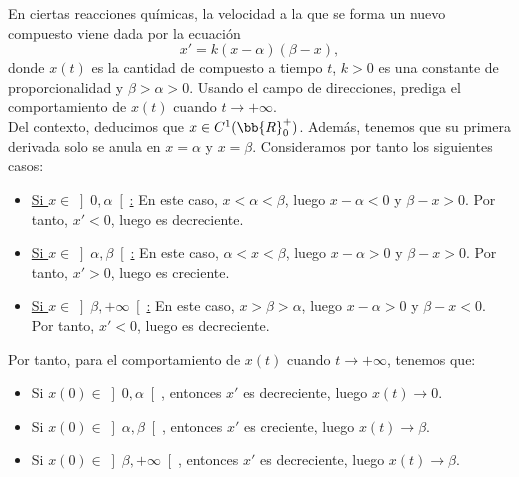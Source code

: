 \begin{ejercicio}
    En ciertas reacciones químicas, la velocidad a la que se forma un nuevo compuesto viene dada por la ecuación
    \begin{equation*}
        x' = k(x - \alpha)(\beta - x),
    \end{equation*}
    donde \(x(t)\) es la cantidad de compuesto a tiempo \(t\), \(k > 0\) es una constante de proporcionalidad y \(\beta > \alpha > 0\). Usando el campo de direcciones, prediga el comportamiento de \(x(t)\) cuando \(t \to +\infty\).\\

    Del contexto, deducimos que $x\in C^1(\bb{R}^+_0)$. Además, tenemos que su primera derivada solo se anula en $x=\alpha$ y $x=\beta$.
    Consideramos por tanto los siguientes casos:
    \begin{itemize}
        \item \ul{Si $x\in \left]0, \alpha\right[$:} En este caso, $x<\alpha<\beta$, luego $x-\alpha<0$ y $\beta-x>0$. Por tanto, $x'<0$,
        luego es decreciente.
        \item \ul{Si $x\in \left]\alpha, \beta\right[$:} En este caso, $\alpha<x<\beta$, luego $x-\alpha>0$ y $\beta-x>0$. Por tanto, $x'>0$,
        luego es creciente.
        \item \ul{Si $x\in \left]\beta, +\infty\right[$:} En este caso, $x>\beta>\alpha$, luego $x-\alpha>0$ y $\beta-x<0$. Por tanto, $x'<0$,
        luego es decreciente.
    \end{itemize}

    Por tanto, para el comportamiento de $x(t)$ cuando $t\to +\infty$, tenemos que:
    \begin{itemize}
        \item Si $x(0)\in \left]0, \alpha\right[$, entonces $x'$ es decreciente, luego $x(t)\to 0$.
        \item Si $x(0)\in \left]\alpha, \beta\right[$, entonces $x'$ es creciente, luego $x(t)\to \beta$.
        \item Si $x(0)\in \left]\beta, +\infty\right[$, entonces $x'$ es decreciente, luego $x(t)\to \beta$.
    \end{itemize}
\end{ejercicio}



